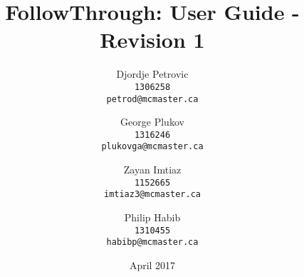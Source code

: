 \documentclass[
  oneside,
  11pt, a4paper,
  footinclude=true,
  headinclude=true,
  cleardoublepage=empty
]{scrbook}
\title{FollowThrough: User Guide - Revision 1}
\author{
  Djordje Petrovic\\ \texttt{1306258}\\ \texttt{petrod@mcmaster.ca} \and George Plukov\\ \texttt{1316246}\\ \texttt{plukovga@mcmaster.ca} \and Zayan Imtiaz\\ \texttt{1152665}\\ \texttt{imtiaz3@mcmaster.ca} \and Philip Habib \\ \texttt{1310455}\\ \texttt{habibp@mcmaster.ca}
}
\begin{document}
\date{April 2017}
\maketitle

\setcounter{chapter}{-1}








\end{document}
